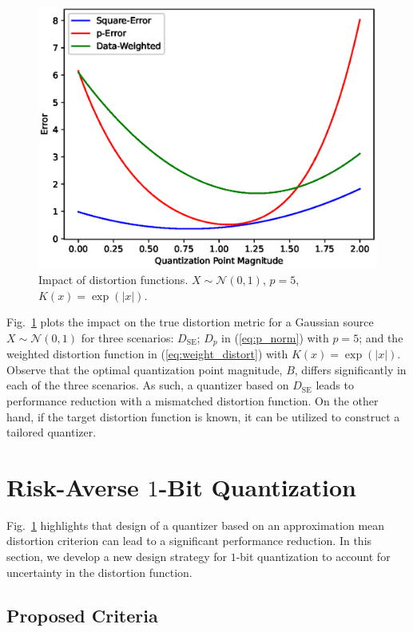 \documentclass[journal]{IEEEtran}
\begin{document}
\begin{figure}
	\centering
	\includegraphics[width=\linewidth]{impact_distortion.eps}%
	\caption{Impact of distortion functions. $X \sim \mathcal{N}(0,1)$, $p = 5$, $K(x) = \exp(|x|)$.}
	\label{fig:impact_distortion}
\end{figure}

Fig.~\ref{fig:impact_distortion} plots the impact on the true distortion metric for a Gaussian source $X \sim \mathcal{N}(0,1)$ for three scenarios: $D_{\mathrm{SE}}$; $D_p$ in (\ref{eq:p_norm}) with $p = 5$; and the weighted distortion function in (\ref{eq:weight_distort}) with $K(x) = \exp(|x|)$. Observe that the optimal quantization point magnitude, $B$, differs significantly in each of the three scenarios. As such, a quantizer based on $D_{\mathrm{SE}}$ leads to performance reduction with a mismatched distortion function. On the other hand, if the target distortion function is known, it can be utilized to construct a tailored quantizer.

\section{Risk-Averse $1$-Bit Quantization}

Fig.~\ref{fig:impact_distortion} highlights that design of a quantizer based on an approximation mean distortion criterion can lead to a significant performance reduction. In this section, we develop a new design strategy for $1$-bit quantization to account for uncertainty in the distortion function.

\subsection{Proposed Criteria}
\end{document}
